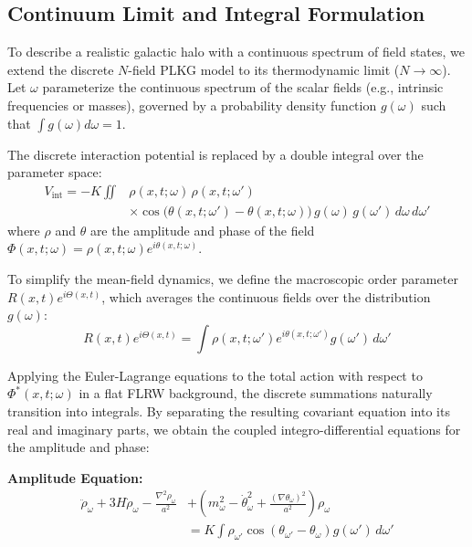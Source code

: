 \subsection{Continuum Limit and Integral Formulation}
\label{subsec:continuum}

To describe a realistic galactic halo with a continuous spectrum of field states, we extend the discrete $N$-field PLKG model to its thermodynamic limit ($N \to \infty$). Let $\omega$ parameterize the continuous spectrum of the scalar fields (e.g., intrinsic frequencies or masses), governed by a probability density function $g(\omega)$ such that $\int g(\omega) d\omega = 1$.

The discrete interaction potential is replaced by a double integral over the parameter space:
\begin{equation}
    \begin{aligned}
        V_{\text{int}} = -K \iint &\rho(x, t; \omega) \, \rho(x, t; \omega') \\
        &\times \cos\!\bigl(\theta(x, t; \omega') - \theta(x, t; \omega)\bigr) \, g(\omega) \, g(\omega') \, d\omega \, d\omega'
    \end{aligned}
\end{equation}
where $\rho$ and $\theta$ are the amplitude and phase of the field $\Phi(x,t;\omega) = \rho(x,t;\omega) e^{i\theta(x,t;\omega)}$.

To simplify the mean-field dynamics, we define the macroscopic order parameter $R(x,t) e^{i\Theta(x,t)}$, which averages the continuous fields over the distribution $g(\omega)$:
\begin{equation}
    R(x,t) e^{i\Theta(x,t)} = \int \rho(x,t; \omega') e^{i\theta(x,t; \omega')} g(\omega') \, d\omega'
\end{equation}

Applying the Euler-Lagrange equations to the total action with respect to $\Phi^*(x,t;\omega)$ in a flat FLRW background, the discrete summations naturally transition into integrals. By separating the resulting covariant equation into its real and imaginary parts, we obtain the coupled integro-differential equations for the amplitude and phase:

\textbf{Amplitude Equation:}
\begin{equation}
    \begin{aligned}
        \ddot{\rho}_\omega + 3H\dot{\rho}_\omega - \frac{\nabla^2\rho_\omega}{a^2}
        &+ \left( m_\omega^2 - \dot{\theta}_\omega^2 + \frac{(\nabla\theta_\omega)^2}{a^2} \right)\rho_\omega \\
        &= K \int \rho_{\omega'} \cos(\theta_{\omega'} - \theta_\omega) g(\omega') \, d\omega'
    \end{aligned}
\end{equation}


